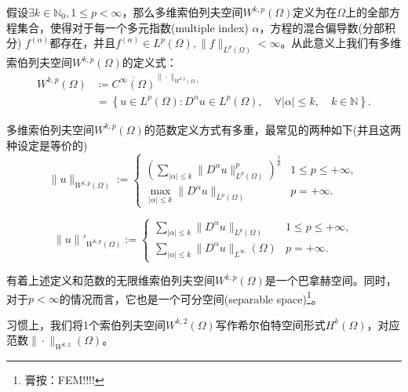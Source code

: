 \begin{definition}[索伯列夫空间]
假设$\exists k \in \mathbb{N}_0, 1 \le p < \infty$，那么多维索伯列夫空间$W^{k,p}(\Omega)$定义为在$\Omega$上的全部方程集合，使得对于每一个多元指数(multiple index) $\alpha$，方程的混合偏导数(分部积分) $f^{(\alpha)}$都存在，并且$f^{(\alpha)} \in L^p(\Omega), \big\| f \big\|_{L^p(\Omega)} < \infty$。从此意义上我们有多维索伯列夫空间$W^{k,p}(\Omega)$的定义式：
\begin{equation}
  \label{eq:sobolev-space-def}
\begin{split}
    W^{k,p}(\Omega) &\coloneqq \overline{C^{\infty}(\Omega)}^{\|\cdot\|_{W^{k,p}(\Omega)}}\\
    &= \left\{ u \in L^p(\Omega): D^{\alpha} u \in L^p (\Omega), \quad \forall \left| \alpha \right| \le k, \quad k \in \mathbb{N} \right\}.
\end{split}
\end{equation}

多维索伯列夫空间$W^{k,p}(\Omega)$的范数定义方式有多重，最常见的两种如下(并且这两种设定是等价的)
\begin{equation}
  \label{eq:sobolev-space-norm-def}
    \|u\|_{W^{k,p}(\Omega)} := \begin{cases}
    \left( \sum_{\left| \alpha \right| \le k} \Big\| D^{\alpha} u \big\|^p_{L^p(\Omega)} \right)^{\frac{1}{p}} & 1 \le p \le +\infty,\\
    \max_{\left| \alpha \right| \le k} \Big\| D^{\alpha} u \Big\| _{L^p(\Omega)} & p = +\infty.
  \end{cases}
\end{equation}

\begin{equation*}
  \|u\|'_{W^{k,p}(\Omega)} :=
  \begin{cases}
    \sum_{\left| \alpha \right| \le k} \Big\| D^{\alpha} u \Big\|_{L^p(\Omega)} & 1 \le p \le +\infty, \\
    \sum_{\left| \alpha \right| \le k} \big\|D^{\alpha} u \Big\|_{L^{\infty}}(\Omega) & p = + \infty.
  \end{cases}
\end{equation*}
\end{definition}

有着上述定义和范数的无限维索伯列夫空间$W^{k,p}(\Omega)$是一个巴拿赫空间。同时，对于$p < \infty$的情况而言，它也是一个可分空间(separable space)\footnote{膏按：FEM!!!!}。

习惯上，我们将1个索伯列夫空间$W^{k,2}(\Omega)$写作希尔伯特空间形式$H^{k}(\Omega)$，对应范数$\big\| \cdot \big\|_{W^{k,2}}(\Omega)$。

